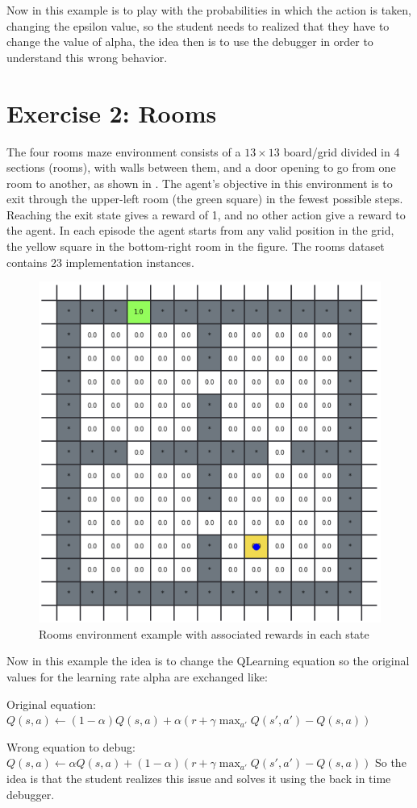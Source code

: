 Now in this example is to play with the probabilities in which the action is taken, changing 
the epsilon value, so the student needs to realized that they have to change the value of 
alpha, the idea then is to use the debugger in order to understand this wrong behavior.

\section{Exercise 2: Rooms}

The four rooms maze environment consists of a $13\times 13$ board/grid divided in 4 sections 
(\ie rooms), with walls between them, and a door opening to go from one room to another, as shown 
in . The agent's objective in this environment is to exit through the upper-left room 
(the green square) in the fewest possible steps. Reaching the exit state gives a reward of 1, and no 
other action give a reward to the agent.
In each episode the agent starts from any valid position in the grid, \eg the yellow square in the 
bottom-right room in the figure. The rooms dataset contains 23 implementation instances.

\begin{figure}[h]
  \centering
  \includegraphics[width=0.5\columnwidth]{figures/rooms.png}
  \caption{Rooms environment example with associated rewards in each state}
  \label{fig:rooms}
\end{figure}

Now in this example the idea is to change the QLearning equation so the original values for 
the learning rate alpha are exchanged like:

Original equation:
$
Q(s, a) \leftarrow (1-\alpha) Q(s, a) + \alpha \left( r + \gamma \max_{a'} Q(s', a') - Q(s, a) \right)
$

Wrong equation to debug:
$
Q(s, a) \leftarrow  \alpha Q(s, a) + (1-\alpha) \left( r + \gamma \max_{a'} Q(s', a') - Q(s, a) \right)
$
So the idea is that the student realizes this issue and solves it using the back in time debugger.

\endinput

